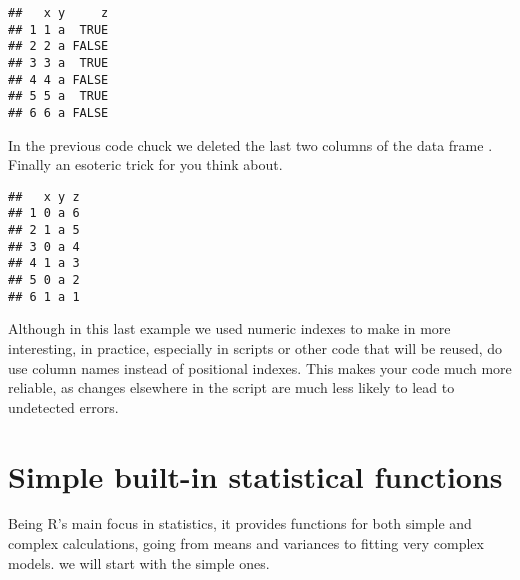 \documentclass[paper=a4,10pt,div=17,headsepline,BCOR=12mm,twoside,open=right]{scrbook}\usepackage{knitr}
\begin{document}
\begin{knitrout}\footnotesize
{}\color{fgcolor}\begin{kframe}
\begin{alltt}
\hlstd{a.df[[}\hlstd{]]} \hlkwb{<-} 
\hlopt{$} \hlkwb{<-} 
\end{alltt}
\begin{verbatim}
##   x y     z
## 1 1 a  TRUE
## 2 2 a FALSE
## 3 3 a  TRUE
## 4 4 a FALSE
## 5 5 a  TRUE
## 6 6 a FALSE
\end{verbatim}
\end{kframe}
\end{knitrout}

In the previous code chuck we deleted the last two columns of the data frame .
Finally an esoteric trick for you think about.

\begin{knitrout}\footnotesize
{}\color{fgcolor}\begin{kframe}
\begin{alltt}
\hlstd{a.df[}\hlopt{:}\hlstd{,} \hlstd{(}\hlstd{,}\hlstd{)]} \hlkwb{<-} \hlstd{a.df[}\hlopt{:}\hlstd{,} \hlstd{(}\hlstd{,}\hlstd{)]}
\end{alltt}
\begin{verbatim}
##   x y z
## 1 0 a 6
## 2 1 a 5
## 3 0 a 4
## 4 1 a 3
## 5 0 a 2
## 6 1 a 1
\end{verbatim}
\end{kframe}
\end{knitrout}

Although in this last example we used numeric indexes to make in more interesting, in practice, especially in scripts or other code that will be reused, do use column names instead of positional indexes. This makes your code much more reliable, as changes elsewhere in the script are much less likely to lead to undetected errors.

\section{Simple built-in statistical functions}

Being R's main focus in statistics, it provides functions for both simple and complex calculations, going from means and variances to fitting very complex models. we will start with the simple ones.
\end{document}
